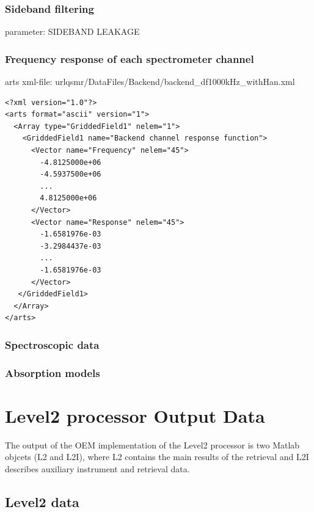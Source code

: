 \subsubsection*{Sideband filtering}

parameter: SIDEBAND LEAKAGE  

\clearpage
\newpage

\subsubsection*{Frequency response of each spectrometer channel}

arts xml-file: url{qsmr/DataFiles/Backend/backend\_df1000kHz\_withHan.xml}


\lstset{language=XML}
\begin{lstlisting}
<?xml version="1.0"?>
<arts format="ascii" version="1">
  <Array type="GriddedField1" nelem="1">
    <GriddedField1 name="Backend channel response function">
      <Vector name="Frequency" nelem="45">
        -4.8125000e+06
        -4.5937500e+06
        ...
        4.8125000e+06
      </Vector>
      <Vector name="Response" nelem="45">
        -1.6581976e-03
        -3.2984437e-03
        ...
        -1.6581976e-03
      </Vector>
   </GriddedField1>
  </Array>
</arts>
\end{lstlisting}


\subsubsection{Spectroscopic data}


\subsubsection*{Absorption models}

\clearpage
\newpage

\section{Level2 processor Output Data}

The output of the OEM implementation of the Level2 processor is
two Matlab objcets (L2 and L2I), where L2 contains
the main results of the retrieval and L2I describes
auxiliary instrument and retrieval data.

\subsection{Level2 data}


